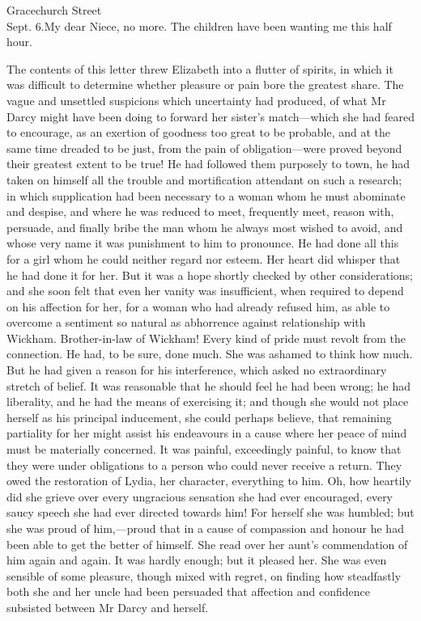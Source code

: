 \begin{mail}{Gracechurch Street\\ Sept. 6.}{My dear Niece,}
no more. The children have been wanting me this half hour.


\end{mail}

The contents of this letter threw Elizabeth into a flutter of spirits, in which it was difficult to determine whether pleasure or pain bore the greatest share. The vague and unsettled suspicions which uncertainty had produced, of what Mr Darcy might have been doing to forward her sister's match—which she had feared to encourage, as an exertion of goodness too great to be probable, and at the same time dreaded to be just, from the pain of obligation—were proved beyond their greatest extent to be true! He had followed them purposely to town, he had taken on himself all the trouble and mortification attendant on such a research; in which supplication had been necessary to a woman whom he must abominate and despise, and where he was reduced to meet, frequently meet, reason with, persuade, and finally bribe the man whom he always most wished to avoid, and whose very name it was punishment to him to pronounce. He had done all this for a girl whom he could neither regard nor esteem. Her heart did whisper that he had done it for her. But it was a hope shortly checked by other considerations; and she soon felt that even her vanity was insufficient, when required to depend on his affection for her, for a woman who had already refused him, as able to overcome a sentiment so natural as abhorrence against relationship with Wickham. Brother-in-law of Wickham! Every kind of pride must revolt from the connection. He had, to be sure, done much. She was ashamed to think how much. But he had given a reason for his interference, which asked no extraordinary stretch of belief. It was reasonable that he should feel he had been wrong; he had liberality, and he had the means of exercising it; and though she would not place herself as his principal inducement, she could perhaps believe, that remaining partiality for her might assist his endeavours in a cause where her peace of mind must be materially concerned. It was painful, exceedingly painful, to know that they were under obligations to a person who could never receive a return. They owed the restoration of Lydia, her character, everything to him. Oh, how heartily did she grieve over every ungracious sensation she had ever encouraged, every saucy speech she had ever directed towards him! For herself she was humbled; but she was proud of him,—proud that in a cause of compassion and honour he had been able to get the better of himself. She read over her aunt's commendation of him again and again. It was hardly enough; but it pleased her. She was even sensible of some pleasure, though mixed with regret, on finding how steadfastly both she and her uncle had been persuaded that affection and confidence subsisted between Mr Darcy and herself.

